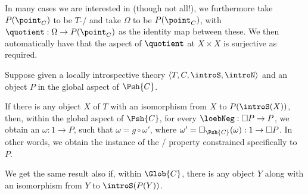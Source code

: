 \begin{corollary}\label{PreIntrospDiagSpecialization}
In many cases we are interested in (though not all!), we furthermore take $P(\point_C)$ to be $T$-\repsmall/ and take $\Omega$ to be $P(\point_C)$, with $\quotient : \Omega \to P(\point_C)$ as the identity map between these. We then automatically have that the aspect of $\quotient$ at ${X \times X}$ is surjective as required.
\end{corollary}

\begin{theorem}\label{PreIntrospDiagFromIso}
Suppose given a locally introspective theory $\langle T, C, \introS, \introN \rangle$ and an object $P$ in the global aspect of $\Psh{C}$.

If there is any object $X$ of $T$ with an isomorphism from $X$ to $P(\introS(X))$, then, within the global aspect of $\Psh{C}$, for every $\loebNeg : \Box P \to P$, we obtain an $\omega : 1 \to P$, such that $\omega = g \circ \omega'$, where $\omega' = \Box_{\Psh{C}}(\omega) : 1 \to \Box P$. In other words, we obtain the instance of the \Loeb/ property constrained specifically to $P$.

We get the same result also if, within $\Glob{C}$, there is any object $Y$ along with an isomorphism from $Y$ to $\introS(P(Y))$.
\end{theorem}
